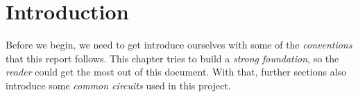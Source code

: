 \documentclass[../../main]{subfiles}
\begin{document}
\section{Introduction} \label{sec:}

Before we begin, we need to get introduce ourselves with some of the \emph{conventions} that this
report follows. This chapter tries to build a \emph{strong foundation}, so the \emph{reader} could
get the most out of this document. With that, further sections also introduce some
\emph{common circuits} used in this project.
\end{document}
